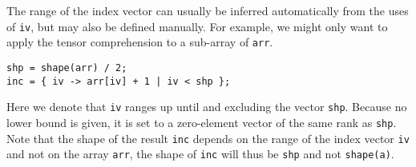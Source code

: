 The range of the index vector can usually be inferred automatically from the uses of \texttt{iv}, but may also be defined manually.
For example, we might only want to apply the tensor comprehension to a sub-array of \texttt{arr}.
\begin{lstlisting}
shp = shape(arr) / 2;
inc = { iv -> arr[iv] + 1 | iv < shp };
\end{lstlisting}

\noindent
Here we denote that \texttt{iv} ranges up until and excluding the vector \texttt{shp}.
Because no lower bound is given, it is set to a zero-element vector of the same rank as \texttt{shp}.
Note that the shape of the result \texttt{inc} depends on the range of the index vector \texttt{iv} and not on the array \texttt{arr}, the shape of \texttt{inc} will thus be \texttt{shp} and not \texttt{shape(a)}.
